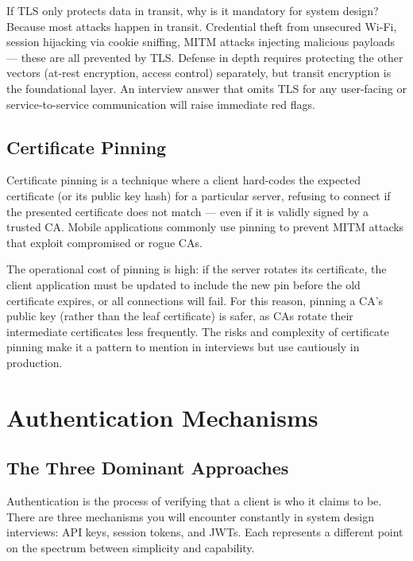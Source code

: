 \documentclass[11pt,a4paper]{article}
\begin{document}
\begin{thinkbox}
If TLS only protects data in transit, why is it mandatory for system design? Because most attacks happen in transit. Credential theft from unsecured Wi-Fi, session hijacking via cookie sniffing, MITM attacks injecting malicious payloads --- these are all prevented by TLS. Defense in depth requires protecting the other vectors (at-rest encryption, access control) separately, but transit encryption is the foundational layer. An interview answer that omits TLS for any user-facing or service-to-service communication will raise immediate red flags.
\end{thinkbox}

\subsection{Certificate Pinning}

Certificate pinning is a technique where a client hard-codes the expected certificate (or its public key hash) for a particular server, refusing to connect if the presented certificate does not match --- even if it is validly signed by a trusted CA. Mobile applications commonly use pinning to prevent MITM attacks that exploit compromised or rogue CAs.

The operational cost of pinning is high: if the server rotates its certificate, the client application must be updated to include the new pin before the old certificate expires, or all connections will fail. For this reason, pinning a CA's public key (rather than the leaf certificate) is safer, as CAs rotate their intermediate certificates less frequently. The risks and complexity of certificate pinning make it a pattern to mention in interviews but use cautiously in production.

\section{Authentication Mechanisms}

\subsection{The Three Dominant Approaches}

Authentication is the process of verifying that a client is who it claims to be. There are three mechanisms you will encounter constantly in system design interviews: API keys, session tokens, and JWTs. Each represents a different point on the spectrum between simplicity and capability.
\end{document}
